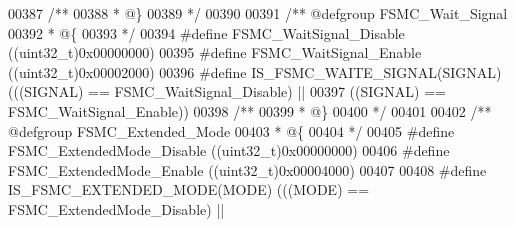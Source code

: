 \begin{DoxyCode}
00387 \textcolor{comment}{/**}
00388 \textcolor{comment}{  * @\}}
00389 \textcolor{comment}{  */}
00390 
00391 \textcolor{comment}{/** @defgroup FSMC\_Wait\_Signal }
00392 \textcolor{comment}{  * @\{}
00393 \textcolor{comment}{  */}
00394 \textcolor{preprocessor}{#}\textcolor{preprocessor}{define} \textcolor{preprocessor}{FSMC\_WaitSignal\_Disable}                  \textcolor{preprocessor}{(}\textcolor{preprocessor}{(}\textcolor{preprocessor}{uint32\_t}\textcolor{preprocessor}{)}0x00000000\textcolor{preprocessor}{)}
00395 \textcolor{preprocessor}{#}\textcolor{preprocessor}{define} \textcolor{preprocessor}{FSMC\_WaitSignal\_Enable}                   \textcolor{preprocessor}{(}\textcolor{preprocessor}{(}\textcolor{preprocessor}{uint32\_t}\textcolor{preprocessor}{)}0x00002000\textcolor{preprocessor}{)}
00396 \textcolor{preprocessor}{#}\textcolor{preprocessor}{define} \textcolor{preprocessor}{IS\_FSMC\_WAITE\_SIGNAL}\textcolor{preprocessor}{(}\textcolor{preprocessor}{SIGNAL}\textcolor{preprocessor}{)} \textcolor{preprocessor}{(}\textcolor{preprocessor}{(}\textcolor{preprocessor}{(}\textcolor{preprocessor}{SIGNAL}\textcolor{preprocessor}{)} \textcolor{preprocessor}{==} FSMC_WaitSignal_Disable\textcolor{preprocessor}{)} \textcolor{preprocessor}{||}
00397                                       \textcolor{preprocessor}{(}\textcolor{preprocessor}{(}\textcolor{preprocessor}{SIGNAL}\textcolor{preprocessor}{)} \textcolor{preprocessor}{==} FSMC_WaitSignal_Enable\textcolor{preprocessor}{)}\textcolor{preprocessor}{)}
00398 \textcolor{comment}{/**}
00399 \textcolor{comment}{  * @\}}
00400 \textcolor{comment}{  */}
00401 
00402 \textcolor{comment}{/** @defgroup FSMC\_Extended\_Mode }
00403 \textcolor{comment}{  * @\{}
00404 \textcolor{comment}{  */}
00405 \textcolor{preprocessor}{#}\textcolor{preprocessor}{define} \textcolor{preprocessor}{FSMC\_ExtendedMode\_Disable}                \textcolor{preprocessor}{(}\textcolor{preprocessor}{(}\textcolor{preprocessor}{uint32\_t}\textcolor{preprocessor}{)}0x00000000\textcolor{preprocessor}{)}
00406 \textcolor{preprocessor}{#}\textcolor{preprocessor}{define} \textcolor{preprocessor}{FSMC\_ExtendedMode\_Enable}                 \textcolor{preprocessor}{(}\textcolor{preprocessor}{(}\textcolor{preprocessor}{uint32\_t}\textcolor{preprocessor}{)}0x00004000\textcolor{preprocessor}{)}
00407 
00408 \textcolor{preprocessor}{#}\textcolor{preprocessor}{define} \textcolor{preprocessor}{IS\_FSMC\_EXTENDED\_MODE}\textcolor{preprocessor}{(}\textcolor{preprocessor}{MODE}\textcolor{preprocessor}{)} \textcolor{preprocessor}{(}\textcolor{preprocessor}{(}\textcolor{preprocessor}{(}\textcolor{preprocessor}{MODE}\textcolor{preprocessor}{)} \textcolor{preprocessor}{==} FSMC_ExtendedMode_Disable\textcolor{preprocessor}{)} \textcolor{preprocessor}{||}

\end{DoxyCode}
